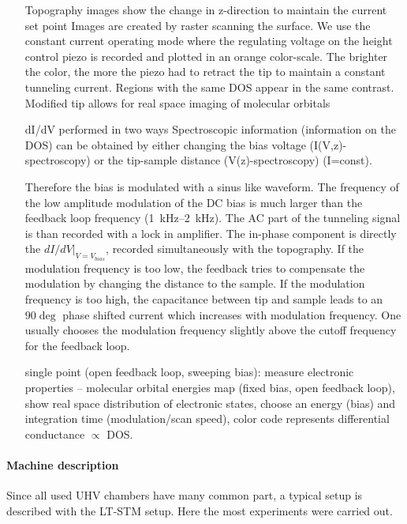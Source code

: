 \begin{itemize}
	\item[Topography images] show the change in z-direction to maintain the current set point
	Images are created by raster scanning the surface. We use the constant current operating mode where the regulating voltage on the height control piezo is recorded and plotted in an orange color-scale. The brighter the color, the more the piezo had to retract the tip to maintain a constant tunneling current. Regions with the same DOS appear in the same contrast.
	\subitem Modified tip allows for real space imaging of molecular orbitals
	\item[dI/dV] performed in two ways
	\subitem Spectroscopic information (information on the DOS) can be obtained by either changing the bias voltage (I(V,z)-spectroscopy) or the tip-sample distance (V(z)-spectroscopy) (I=const).  
	
	Therefore the bias is modulated with a sinus like waveform. The frequency of the low amplitude modulation of the DC bias is much larger than the feedback loop frequency (\SIrange{1}{2}{\kilo \hertz}). The AC part of the tunneling signal is than recorded with a lock in amplifier. The in-phase component is directly the $dI/dV|_{V=V_{bias}}$, recorded simultaneously with the topography. If the modulation frequency is too low, the feedback tries to compensate the modulation by changing the distance to the sample.	If the modulation frequency is too high, the capacitance between tip and sample leads to an $90\deg$ phase shifted current which increases with modulation frequency. One usually chooses the modulation frequency slightly above the cutoff frequency for the feedback loop.
	
	\subitem single point (open feedback loop, sweeping bias): measure electronic properties – molecular orbital energies
	\subitem map (fixed bias, open feedback loop), show real space distribution of electronic states, choose an energy (bias) and integration time (modulation/scan speed), color code represents differential conductance $\propto$ DOS.
\end{itemize}

\paragraph{Machine description}
Since all used UHV chambers have many common part, a typical setup is described with the LT-STM setup. Here the most experiments were carried out.

